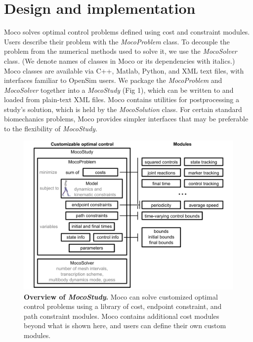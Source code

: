 \documentclass[10pt,letterpaper]{article}
\begin{document}
\section*{Design and implementation}

Moco solves optimal control problems defined using cost and constraint modules. Users describe their problem with the \textit{MocoProblem} class. To decouple the problem from the numerical methods used to solve it, we use the \textit{MocoSolver} class. (We denote names of classes in Moco or its dependencies with italics.) Moco classes are available via C++, Matlab, Python, and XML text files, with interfaces familiar to OpenSim users. We package the \textit{MocoProblem} and \textit{MocoSolver} together into a \textit{MocoStudy} (Fig 1), which can be written to and loaded from plain-text XML files. Moco contains utilities for postprocessing a study’s solution, which is held by the \textit{MocoSolution} class. For certain standard biomechanics problems, Moco provides simpler interfaces that may be preferable to the flexibility of \textit{MocoStudy}.

\begin{figure}[!h]
\centering
    \includegraphics{../figures/MocoStudyDiagram.png}
    \caption{{\bf Overview of \textit{MocoStudy}.}
    Moco can solve customized optimal control problems using a library of cost, endpoint constraint, and path constraint modules. Moco contains additional cost modules beyond what is shown here, and users can define their own custom modules.}
    \label{mocodiagram}
\end{figure}
\end{document}
